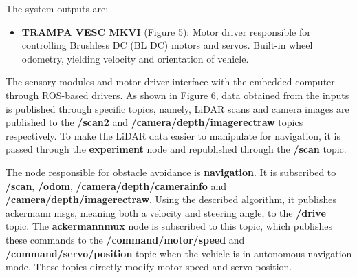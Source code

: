\documentclass[conference]{IEEEtran}
\begin{document}
The system outputs are:

\begin{itemize}
    \item \textbf{TRAMPA VESC MKVI} (Figure 5): Motor driver responsible for controlling Brushless DC (BL DC) motors and servos. Built-in wheel odometry, yielding velocity and orientation of vehicle.
\end{itemize} 

The sensory modules and motor driver interface with the embedded computer through ROS-based drivers. As shown in Figure 6, data obtained from the inputs is published through specific topics, namely, LiDAR scans and camera images are published to the \textbf{/scan2} and \textbf{/camera/depth/image\textunderscore rect\textunderscore raw} topics respectively. To make the LiDAR data easier to manipulate for navigation, it is passed through the \textbf{experiment} node and republished through the \textbf{/scan} topic. 

The node responsible for obstacle avoidance is \textbf{navigation}. It is subscribed to \textbf{/scan}, \textbf{/odom}, \textbf{/camera/depth/camera\textunderscore info} and \textbf{/camera/depth/image\textunderscore rect\textunderscore raw}. Using the described algorithm, it publishes ackermann msgs, meaning both a velocity and steering angle, to the \textbf{/drive} topic. The \textbf{ackermann\textunderscore mux} node is subscribed to this topic, which publishes these commands to the \textbf{/command/motor/speed} and \textbf{/command/servo/position} topic when the vehicle is in autonomous navigation mode. These topics directly modify motor speed and servo position. 


\end{document}
